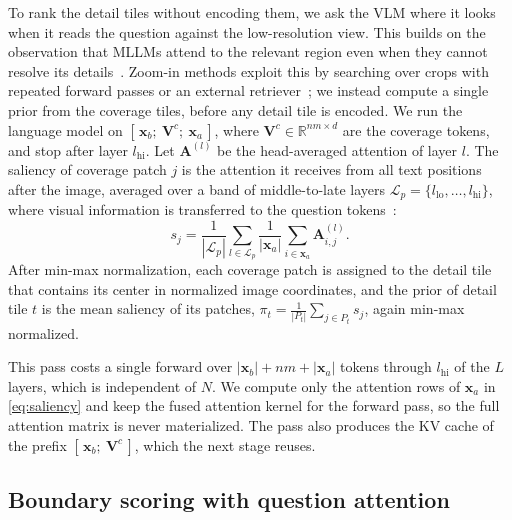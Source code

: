 To rank the detail tiles without encoding them, we ask the VLM where it looks when it reads the question
against the low-resolution view. This builds on the observation that MLLMs attend to the relevant region
even when they cannot resolve its details~\cite{vicrop}. Zoom-in methods exploit this by searching over
crops with repeated forward passes or an external retriever~\cite{vstar,zoomeye,dyfo,rap}; we instead
compute a single prior from the coverage tiles, before any detail tile is encoded. We run the language
model on
$[\,\mathbf{x}_b;\ \mathbf{V}^{c};\ \mathbf{x}_a\,]$, where $\mathbf{V}^{c}\in\mathbb{R}^{nm\times d}$
are the coverage tokens, and stop after layer $l_{\text{hi}}$. Let $\mathbf{A}^{(l)}$ be the
head-averaged attention of layer $l$. The saliency of coverage patch $j$ is the attention it receives
from all text positions after the image, averaged over a band of middle-to-late layers
$\mathcal{L}_p=\{l_{\text{lo}},\dots,l_{\text{hi}}\}$, where visual information is transferred to the
question tokens~\cite{crossmodalflow}:
\begin{equation}
  s_j=\frac{1}{|\mathcal{L}_p|}\sum_{l\in\mathcal{L}_p}\frac{1}{|\mathbf{x}_a|}
      \sum_{i\in\mathbf{x}_a}\mathbf{A}^{(l)}_{i,j}.
  \label{eq:saliency}
\end{equation}
After min-max normalization, each coverage patch is assigned to the detail tile that contains its
center in normalized image coordinates, and the prior of detail tile $t$ is the mean saliency of its
patches, $\pi_t=\frac{1}{|P_t|}\sum_{j\in P_t}s_j$, again min-max normalized.

This pass costs a single forward over $|\mathbf{x}_b|+nm+|\mathbf{x}_a|$ tokens through
$l_{\text{hi}}$ of the $L$ layers, which is independent of $N$. We compute only the attention rows of
$\mathbf{x}_a$ in \cref{eq:saliency} and keep the fused attention kernel for the forward pass, so the
full attention matrix is never materialized. The pass also produces the KV cache of the prefix
$[\,\mathbf{x}_b;\ \mathbf{V}^{c}\,]$, which the next stage reuses.

\subsection{Boundary scoring with question attention}
\label{sec:boundary}

